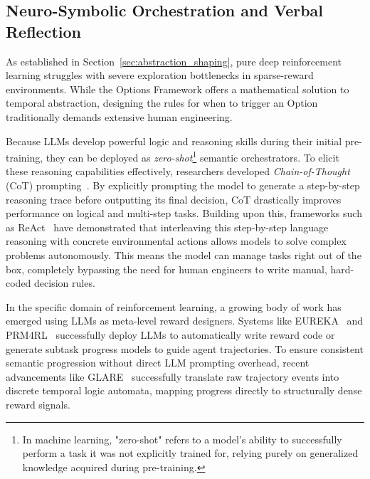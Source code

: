 \subsection{Neuro-Symbolic Orchestration and Verbal Reflection}
\label{sec:llm_rl_integration}

As established in Section~\ref{sec:abstraction_shaping}, pure deep reinforcement learning struggles with severe exploration bottlenecks in sparse-reward environments. While the Options Framework offers a mathematical solution to temporal abstraction, designing the rules for when to trigger an Option traditionally demands extensive human engineering. 

Because LLMs develop powerful logic and reasoning skills during their initial pre-training, they can be deployed as \emph{zero-shot}\footnote{In machine learning, "zero-shot" refers to a model's ability to successfully perform a task it was not explicitly trained for, relying purely on generalized knowledge acquired during pre-training.} semantic orchestrators. To elicit these reasoning capabilities effectively, researchers developed \emph{Chain-of-Thought} (CoT) prompting~\parencite{Wei_Wang_Schuurmans_Bosma_Ichter_Xia_Chi_Le_Zhou_2022}. By explicitly prompting the model to generate a step-by-step reasoning trace before outputting its final decision, CoT drastically improves performance on logical and multi-step tasks. Building upon this, frameworks such as ReAct~\parencite{Yao_Zhao_Yu_Du_Shafran_Narasimhan_Cao_2023} have demonstrated that interleaving this step-by-step language reasoning with concrete environmental actions allows models to solve complex problems autonomously. This means the model can manage tasks right out of the box, completely bypassing the need for human engineers to write manual, hard-coded decision rules.

In the specific domain of reinforcement learning, a growing body of work has emerged using LLMs as meta-level reward designers. Systems like EUREKA~\parencite{ma2024eurekahumanlevelrewarddesign} and PRM4RL~\parencite{Zhang_Gao_Jiang_Chen_Pan_Zhang_Deng_2025} successfully deploy LLMs to automatically write reward code or generate subtask progress models to guide agent trajectories. To ensure consistent semantic progression without direct LLM prompting overhead, recent advancements like GLARE~\parencite{yan2026glare} successfully translate raw trajectory events into discrete temporal logic automata, mapping progress directly to structurally dense reward signals.

